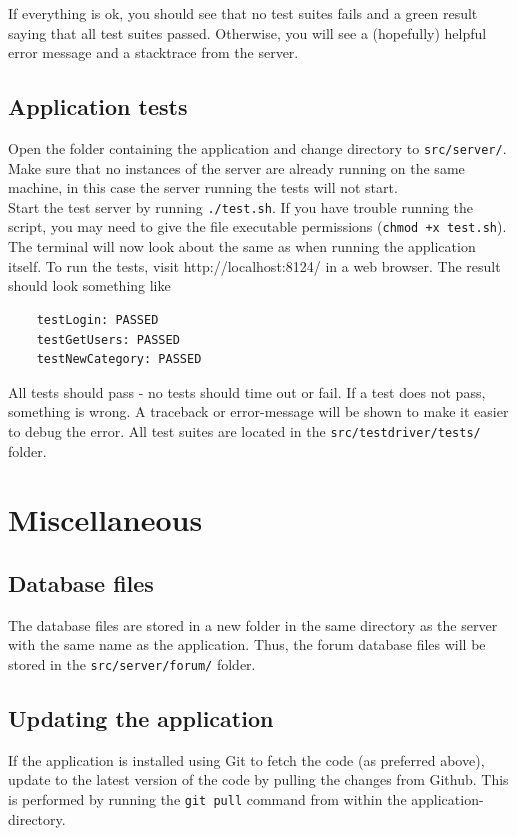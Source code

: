 \documentclass[a4paper, 12pt, titlepage]{article}
\begin{document}
	If everything is ok, you should see that no test suites fails and a green result saying that all test suites passed. Otherwise, you will see a (hopefully) helpful error message and a stacktrace from the server.

	\subsection{Application tests}
	Open the folder containing the application and change directory to \lstinline{src/server/}. Make sure that no instances of the server are already running on the same machine, in this case the server running the tests will not start.\\

	Start the test server by running \lstinline{./test.sh}. If you have trouble running the script, you may need to give the file executable permissions (\lstinline{chmod +x test.sh}).\\

	The terminal will now look about the same as when running the application itself. To run the tests, visit http://localhost:8124/ in a web browser. The result should look something like

	\begin{lstlisting}
	testLogin: PASSED
	testGetUsers: PASSED
	testNewCategory: PASSED
	\end{lstlisting}

	All tests should pass - no tests should time out or fail. If a test does not pass, something is wrong. A traceback or error-message will be shown to make it easier to debug the error. All test suites are located in the \lstinline{src/testdriver/tests/} folder.

	\section{Miscellaneous}
	\subsection{Database files}
	The database files are stored in a new folder in the same directory as the server with the same name as the application. Thus, the forum database files will be stored in the \lstinline{src/server/forum/} folder.

	\subsection{Updating the application}
	If the application is installed using Git to fetch the code (as preferred above), update to the latest version of the code by pulling the changes from Github. This is performed by running the \lstinline{git pull} command from within the application-directory.
\end{document}
